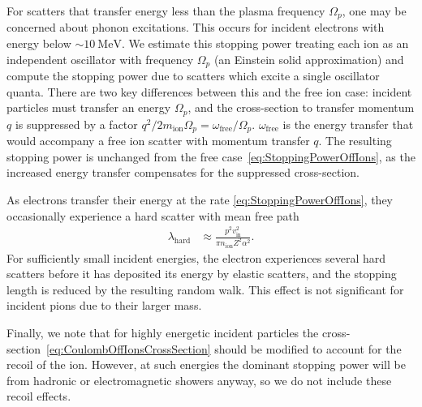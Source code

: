 \documentclass[preprintnumbers,amsmath,amssymb,prd,superscriptaddress]{revtex4}
\newcommand{\MeV}{\text{MeV}}
\newcommand{\x}[1]{\ensuremath{\text{#1}}} %
\newcommand{\ion}{\text{ion}}
\begin{document}
\begin{appendices}
For scatters that transfer energy less than the plasma frequency $\Omega_p$, one may be concerned about phonon excitations.
This occurs for incident electrons with energy below $\sim 10~\MeV$.
We estimate this stopping power treating each ion as an independent oscillator with frequency $\Omega_p$ (an Einstein solid approximation) and compute the stopping power due to scatters which excite a single oscillator quanta.
There are two key differences between this and the free ion case: incident particles must transfer an energy $\Omega_p$, and the cross-section to transfer momentum $q$ is suppressed by a factor $q^2 / 2 m_\ion\Omega_p = \omega_\x{free}/\Omega_p$.
$\omega_\x{free}$ is the energy transfer that would accompany a free ion scatter with momentum transfer $q$.
The resulting stopping power is unchanged from the free case~\eqref{eq:StoppingPowerOffIons}, as the increased energy transfer compensates for the suppressed cross-section.

As electrons transfer their energy at the rate \eqref{eq:StoppingPowerOffIons}, they occasionally experience a hard scatter with mean free path
\begin{align}
\lambda_\text{hard} &\approx \frac{p^2 v_\text{in}^2}{\pi n_\text{ion}Z^2 \alpha^2}.
\end{align}
For sufficiently small incident energies, the electron experiences several hard scatters before it has deposited its energy by elastic scatters, and the stopping length is reduced by the resulting random walk.
This effect is not significant for incident pions due to their larger mass.

Finally, we note that for highly energetic incident particles the cross-section~\eqref{eq:CoulombOffIonsCrossSection} should be modified to account for the recoil of the ion.
However, at such energies the dominant stopping power will be from hadronic or electromagnetic showers anyway, so we do not include these recoil effects.


\end{appendices}
\end{document}
